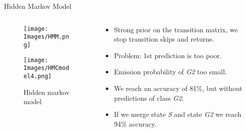 \documentclass{beamer}
\begin{document}
\fi

\iffalse

\begin{frame}{Hidden Markov Model}
To more strongly take into account time dependencies, we use a Hidden State Markov model. \\
An observation sequence: tracking and first model prediction for one cell in each of the frame in which he appears. 
\begin{figure}[!ht]
\centering
\texttt{[image: Images/HMM.png]}
\caption{Correcting a trajectory with the hidden markov chain}
\label{trajectory}
\textit{$Y^{rf}_i$ is the prediction of the cell at a certain frame $i$, $Y_i$ in its true state}
\end{figure}

\end{frame}

\fi

\begin{frame}{Hidden Markov Model}

\begin{columns}[T] %
\begin{column}{.48\textwidth}
\begin{figure}[!ht]
\centering
\texttt{[image: Images/HMM.png]}
\label{trajectory}
\end{figure}

\begin{figure}[!ht]
\centering
\texttt{[image: Images/HMCmodel4.png]}
\caption{Hidden markov model}
\label{statetransition}
\end{figure}
\end{column}%

\hfill%

\begin{column}{.48\textwidth}
\begin{itemize}
\item Strong prior on the transition matrix, we stop transition skips and returns.
\item Problem: 1st prediction is too poor. 
\item Emission probability of \textit{G2} too small.
\item We reach an accuracy of 81\%, but without predictions of class \textit{G2}.
\item If we merge state \textit{S} and state \textit{G2} we reach 94\% accuracy.
\end{itemize}
\end{column}%
\end{columns}
\end{frame}
\end{document}
